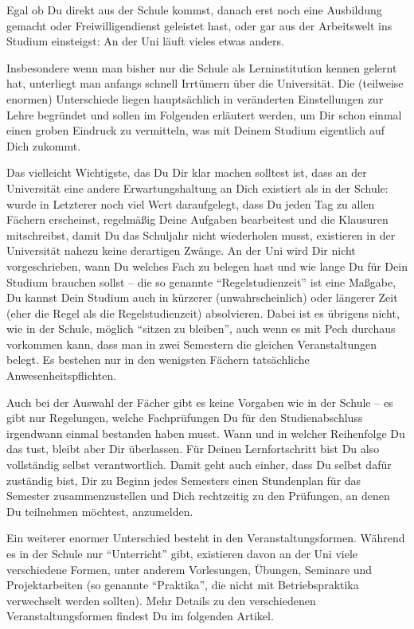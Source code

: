 {Egal ob Du direkt aus der Schule kommst, danach erst noch eine Ausbildung gemacht oder Freiwilligendienst geleistet hast, oder gar aus der Arbeitswelt ins Studium einsteigst: An der Uni läuft vieles etwas anders.}
{Insbesondere wenn man bisher nur die Schule als Lerninstitution kennen gelernt hat, unterliegt man anfangs schnell Irrtümern über die Universität. Die (teilweise enormen) Unterschiede liegen hauptsächlich in veränderten Einstellungen zur Lehre begründet und sollen im Folgenden erläutert werden, um Dir schon einmal einen groben Eindruck zu vermitteln, was mit Deinem Studium eigentlich auf Dich zukommt.

    Das vielleicht Wichtigste, das Du Dir klar machen solltest ist, dass an der Universität eine andere Erwartungshaltung an Dich existiert als in der Schule: wurde in Letzterer noch viel Wert daraufgelegt, dass Du jeden Tag zu allen Fächern erscheinst, regelmäßig Deine Aufgaben bearbeitest und die Klausuren mitschreibst, damit Du das Schuljahr nicht wiederholen musst, existieren in der Universität nahezu keine derartigen Zwänge. An der Uni wird Dir nicht vorgeschrieben, wann Du welches Fach zu belegen hast und wie lange Du für Dein Studium brauchen sollst – die so genannte "`Regelstudienzeit"' ist eine Maßgabe, Du kannst Dein Studium auch in kürzerer (unwahrscheinlich) oder längerer Zeit (eher die Regel als die Regelstudienzeit) absolvieren. Dabei ist es übrigens nicht, wie in der Schule, möglich "`sitzen zu bleiben"', auch wenn es mit Pech durchaus vorkommen kann, dass man in zwei Semestern die gleichen Veranstaltungen belegt. Es bestehen nur in den wenigsten Fächern tatsächliche Anwesenheitspflichten.

    Auch bei der Auswahl der Fächer gibt es keine Vorgaben wie in der Schule – es gibt nur Regelungen, welche Fachprüfungen Du für den Studienabschluss irgendwann einmal bestanden haben musst. Wann und in welcher Reihenfolge Du das tust, bleibt aber Dir überlassen. Für Deinen Lernfortschritt bist Du also vollständig selbst verantwortlich. Damit geht auch einher, dass Du selbst dafür zuständig bist, Dir zu Beginn jedes Semesters einen Stundenplan für das Semester zusammenzustellen und Dich rechtzeitig zu den Prüfungen, an denen Du teilnehmen möchtest, anzumelden.

    Ein weiterer enormer Unterschied besteht in den Veranstaltungsformen. Während es in der Schule nur "`Unterricht"' gibt, existieren davon an der Uni viele verschiedene Formen, unter anderem Vorlesungen, Übungen, Seminare und Projektarbeiten (so genannte "`Praktika"', die nicht mit Betriebspraktika verwechselt werden sollten). Mehr Details zu den verschiedenen Veranstaltungsformen findest Du im folgenden Artikel.

}
